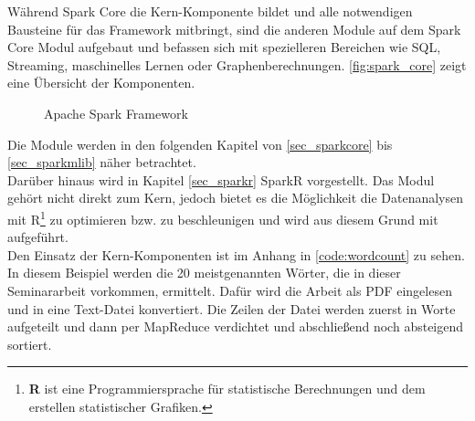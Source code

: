 \noindent
Während Spark Core die Kern-Komponente bildet und alle notwendigen Bausteine für das Framework mitbringt, sind die anderen Module auf dem Spark Core Modul aufgebaut und befassen sich mit spezielleren Bereichen wie SQL, Streaming, maschinelles Lernen oder Graphenberechnungen. \autoref{fig:spark_core} zeigt eine Übersicht der Komponenten. \\

\begin{figure}[h]
  \centering
  \caption{Apache Spark Framework \cite{DATABRICK_SPARK_KEY_TERMS}}\label{fig:spark_core}
\end{figure}


\noindent
Die Module werden in den folgenden Kapitel von \ref{sec_sparkcore} bis \ref{sec_sparkmlib} näher betrachtet. \\

\noindent
Darüber hinaus wird in Kapitel \ref{sec_sparkr} SparkR vorgestellt. Das Modul gehört nicht direkt zum Kern, jedoch bietet es die Möglichkeit die Datenanalysen mit R\footnote{\textbf{R} ist eine Programmiersprache für statistische Berechnungen und dem erstellen statistischer Grafiken. } zu optimieren bzw. zu beschleunigen und wird aus diesem Grund mit aufgeführt. \\

\noindent
Den Einsatz der Kern-Komponenten ist im Anhang in \autoref{code:wordcount} zu sehen. In diesem Beispiel werden die 20 meistgenannten Wörter, die in dieser Seminararbeit vorkommen, ermittelt. Dafür wird die Arbeit als PDF eingelesen und in eine Text-Datei konvertiert. Die Zeilen der Datei werden zuerst in Worte aufgeteilt und dann per MapReduce verdichtet und abschließend noch absteigend sortiert.




